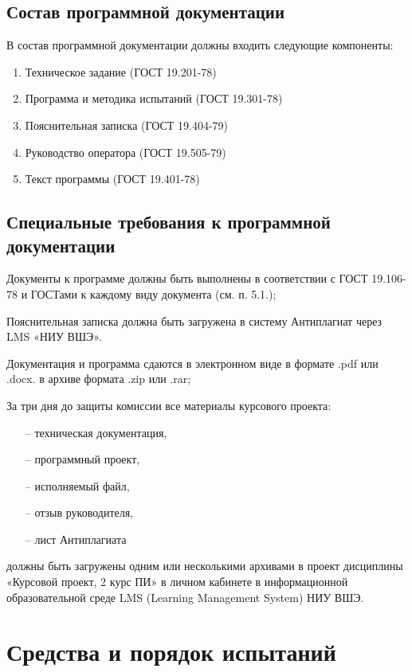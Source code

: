 \documentclass{../../includes/TechDocMultiAuthors}
\begin{document}
    \subsection{Состав программной документации}

    В состав программной документации должны входить следующие компоненты:
    \begin{enumerate}
        \item Техническое задание (ГОСТ 19.201-78)
        \item Программа и методика испытаний (ГОСТ 19.301-78)
        \item Пояснительная записка (ГОСТ 19.404-79)
        \item Руководство оператора (ГОСТ 19.505-79)
        \item Текст программы (ГОСТ 19.401-78)
    \end{enumerate}

    \subsection{Специальные требования к программной документации}

    Документы к программе должны быть выполнены в соответствии с ГОСТ 19.106-78 и ГОСТами к каждому виду документа (см. п. 5.1.);

    Пояснительная записка должна быть загружена в систему Антиплагиат через LMS «НИУ ВШЭ».

    Документация и программа сдаются в электронном виде в формате .pdf или .docx. в архиве формата .zip или .rar;

    За три дня до защиты комиссии все материалы курсового проекта:
    \begin{itemize}
        \item[--] техническая документация,
        \item[--] программный проект,
        \item[--] исполняемый файл,
        \item[--] отзыв руководителя,
        \item[--] лист Антиплагиата
    \end{itemize}
    должны быть загружены одним или несколькими архивами в проект дисциплины «Курсовой проект, 2 курс ПИ» в личном кабинете в информационной образовательной среде LMS (Learning Management System) НИУ ВШЭ.

    \section{Средства и порядок испытаний}
\end{document}

